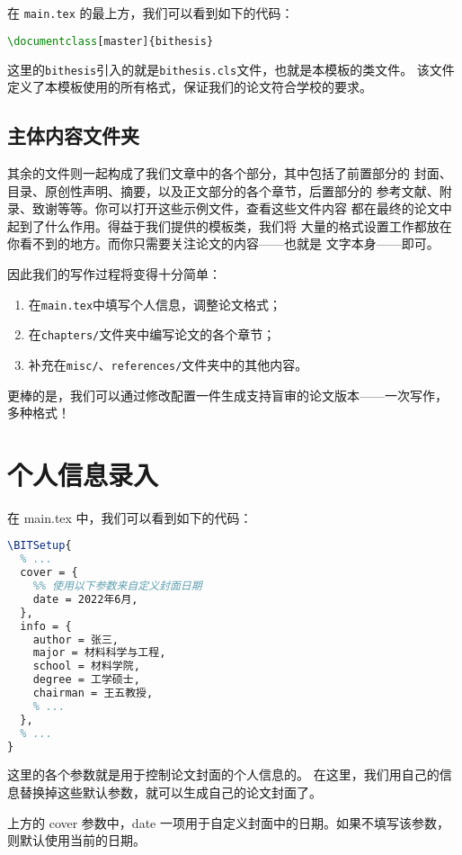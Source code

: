 在 \texttt{main.tex} 的最上方，我们可以看到如下的代码：
\begin{lstlisting}[language=TeX]
\documentclass[master]{bithesis}
\end{lstlisting}
这里的\texttt{bithesis}引入的就是\texttt{bithesis.cls}文件，也就是本模板的类文件。
该文件定义了本模板使用的所有格式，保证我们的论文符合学校的要求。

\subsection{主体内容文件夹}

其余的文件则一起构成了我们文章中的各个部分，其中包括了前置部分的
封面、目录、原创性声明、摘要，以及正文部分的各个章节，后置部分的
参考文献、附录、致谢等等。你可以打开这些示例文件，查看这些文件内容
都在最终的论文中起到了什么作用。得益于我们提供的模板类，我们将
大量的格式设置工作都放在你看不到的地方。而你只需要关注论文的内容——也就是
文字本身——即可。

因此我们的写作过程将变得十分简单：
\begin{enumerate}
  \item 在\texttt{main.tex}中填写个人信息，调整论文格式；
  \item 在\texttt{chapters/}文件夹中编写论文的各个章节；
  \item 补充在\texttt{misc/}、\texttt{references/}文件夹中的其他内容。
\end{enumerate}

更棒的是，我们可以通过修改配置一件生成支持盲审的论文版本——一次写作，
多种格式！

\section{个人信息录入}

在 main.tex 中，我们可以看到如下的代码：
\begin{lstlisting}[language=TeX]
\BITSetup{
  % ...
  cover = {
    %% 使用以下参数来自定义封面日期
    date = 2022年6月,
  },
  info = {
    author = 张三,
    major = 材料科学与工程,
    school = 材料学院,
    degree = 工学硕士,
    chairman = 王五教授,
    % ...
  },
  % ...
}
\end{lstlisting}

这里的各个参数就是用于控制论文封面的个人信息的。
在这里，我们用自己的信息替换掉这些默认参数，就可以生成自己的论文封面了。

上方的 cover 参数中，date 一项用于自定义封面中的日期。如果不填写该参数，
则默认使用当前的日期。


